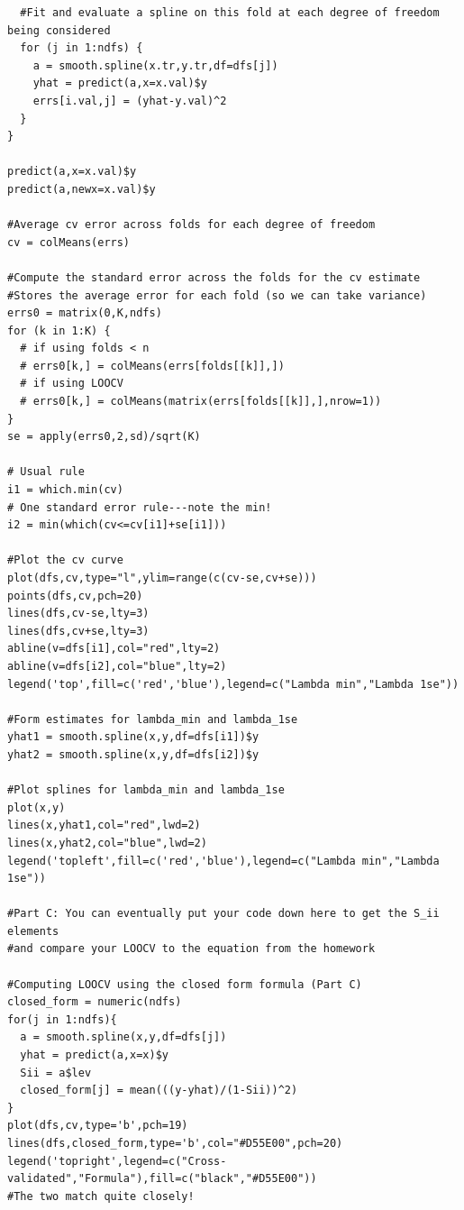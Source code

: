 \documentclass[12pt]{article}
\newcommand{\1}{\mathbbm{1}}
\begin{document}
\begin{verbatim}
  #Fit and evaluate a spline on this fold at each degree of freedom being considered
  for (j in 1:ndfs) {
    a = smooth.spline(x.tr,y.tr,df=dfs[j])
    yhat = predict(a,x=x.val)$y
    errs[i.val,j] = (yhat-y.val)^2
  }
}

predict(a,x=x.val)$y
predict(a,newx=x.val)$y

#Average cv error across folds for each degree of freedom
cv = colMeans(errs)

#Compute the standard error across the folds for the cv estimate
#Stores the average error for each fold (so we can take variance)
errs0 = matrix(0,K,ndfs)
for (k in 1:K) {
  # if using folds < n
  # errs0[k,] = colMeans(errs[folds[[k]],])
  # if using LOOCV
  # errs0[k,] = colMeans(matrix(errs[folds[[k]],],nrow=1))
}
se = apply(errs0,2,sd)/sqrt(K)

# Usual rule
i1 = which.min(cv)
# One standard error rule---note the min!
i2 = min(which(cv<=cv[i1]+se[i1]))

#Plot the cv curve
plot(dfs,cv,type="l",ylim=range(c(cv-se,cv+se)))
points(dfs,cv,pch=20)
lines(dfs,cv-se,lty=3)
lines(dfs,cv+se,lty=3)
abline(v=dfs[i1],col="red",lty=2)
abline(v=dfs[i2],col="blue",lty=2)
legend('top',fill=c('red','blue'),legend=c("Lambda min","Lambda 1se"))

#Form estimates for lambda_min and lambda_1se
yhat1 = smooth.spline(x,y,df=dfs[i1])$y
yhat2 = smooth.spline(x,y,df=dfs[i2])$y

#Plot splines for lambda_min and lambda_1se
plot(x,y)
lines(x,yhat1,col="red",lwd=2)
lines(x,yhat2,col="blue",lwd=2)
legend('topleft',fill=c('red','blue'),legend=c("Lambda min","Lambda 1se"))

#Part C: You can eventually put your code down here to get the S_ii elements
#and compare your LOOCV to the equation from the homework

#Computing LOOCV using the closed form formula (Part C)
closed_form = numeric(ndfs)
for(j in 1:ndfs){
  a = smooth.spline(x,y,df=dfs[j])
  yhat = predict(a,x=x)$y
  Sii = a$lev
  closed_form[j] = mean(((y-yhat)/(1-Sii))^2)
}
plot(dfs,cv,type='b',pch=19)
lines(dfs,closed_form,type='b',col="#D55E00",pch=20)
legend('topright',legend=c("Cross-validated","Formula"),fill=c("black","#D55E00"))
#The two match quite closely!
























\end{verbatim}
\end{document}
